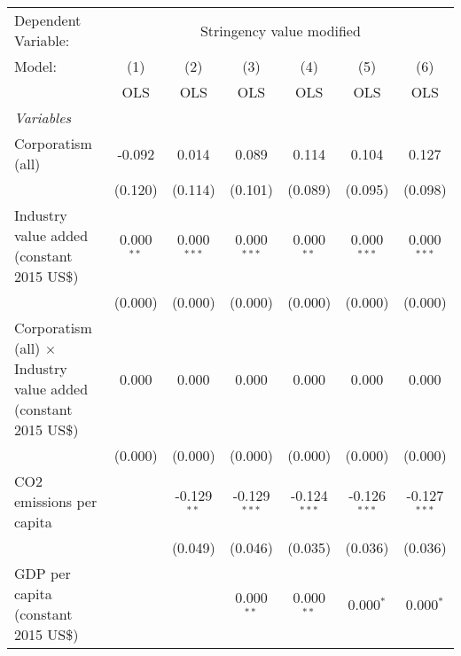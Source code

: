 
\begingroup
\centering
\begin{tabular}{lcccccc}
   \toprule
   Dependent Variable: & \multicolumn{6}{c}{Stringency value modified}\\
   Model:                                                                 & (1)          & (2)           & (3)            & (4)            & (5)            & (6)\\  
                                                                          &  OLS         & OLS           & OLS            & OLS            & OLS            & OLS\\  
   \midrule
   \emph{Variables}\\
   Corporatism (all)                                                      & -0.092       & 0.014         & 0.089          & 0.114          & 0.104          & 0.127\\   
                                                                          & (0.120)      & (0.114)       & (0.101)        & (0.089)        & (0.095)        & (0.098)\\   
   Industry value added (constant 2015 US\$)                              & 0.000$^{**}$ & 0.000$^{***}$ & 0.000$^{***}$  & 0.000$^{**}$   & 0.000$^{***}$  & 0.000$^{***}$\\   
                                                                          & (0.000)      & (0.000)       & (0.000)        & (0.000)        & (0.000)        & (0.000)\\   
   Corporatism (all) $\times$ Industry value added (constant 2015 US\$)   & 0.000        & 0.000         & 0.000          & 0.000          & 0.000          & 0.000\\   
                                                                          & (0.000)      & (0.000)       & (0.000)        & (0.000)        & (0.000)        & (0.000)\\   
   CO2 emissions per capita                                               &              & -0.129$^{**}$ & -0.129$^{***}$ & -0.124$^{***}$ & -0.126$^{***}$ & -0.127$^{***}$\\   
                                                                          &              & (0.049)       & (0.046)        & (0.035)        & (0.036)        & (0.036)\\   
   GDP per capita (constant 2015 US\$)                                    &              &               & 0.000$^{**}$   & 0.000$^{**}$   & 0.000$^{*}$    & 0.000$^{*}$\\   

\end{tabular}
